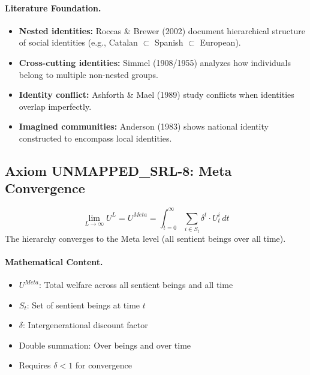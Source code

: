 \paragraph{Literature Foundation.}
\begin{itemize}
\item \textbf{Nested identities:} Roccas \& Brewer (2002) document hierarchical 
structure of social identities (e.g., Catalan $\subset$ Spanish $\subset$ European).
\item \textbf{Cross-cutting identities:} Simmel (1908/1955) analyzes how 
individuals belong to multiple non-nested groups.
\item \textbf{Identity conflict:} Ashforth \& Mael (1989) study conflicts when 
identities overlap imperfectly.
\item \textbf{Imagined communities:} Anderson (1983) shows national identity 
constructed to encompass local identities.
\end{itemize}

\subsection{Axiom UNMAPPED_SRL-8: Meta Convergence}

\begin{tcolorbox}[colback=gray!5!white, colframe=gray!75!black, title=Axiom UNMAPPED_SRL-8: Meta Convergence]
\begin{equation}
\boxed{
\lim_{L \to \infty} U^L = U^{Meta} = \int_{t=0}^{\infty} \sum_{i \in S_t} \delta^t \cdot U^i_t \, dt
}
\end{equation}
The hierarchy converges to the Meta level (all sentient beings over all time).
\end{tcolorbox}

\paragraph{Mathematical Content.}
\begin{itemize}
\item $U^{Meta}$: Total welfare across all sentient beings and all time
\item $S_t$: Set of sentient beings at time $t$
\item $\delta$: Intergenerational discount factor
\item Double summation: Over beings and over time
\item Requires $\delta < 1$ for convergence
\end{itemize}

